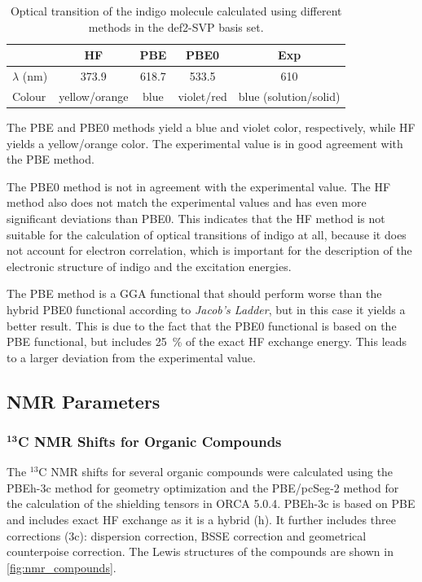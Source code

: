 \documentclass[fontsize=11pt,a4paper,oneside]{scrartcl}
\begin{document}
\begin{table}[htbp]
    \centering
    \caption{Optical transition of the indigo molecule calculated using different methods in the def2-SVP basis set.}
        \begin{tabular}{@{}lcccc@{}} \toprule
        & HF & PBE & PBE0 & Exp\autocite{AKGrimme2025} \\
        \midrule
        $\lambda$ (nm) & 373.9 & 618.7 & 533.5 & 610 \\
        Colour & yellow/orange & blue & violet/red & blue (solution/solid) \\
        \bottomrule
        \end{tabular}
        \label{tab:indigo_optical_transitions}
\end{table}

The \ac{PBE} and \ac{PBE0} methods yield a blue and violet color, respectively, while \ac{HF} yields a yellow/orange color. The experimental value is in good agreement with the \ac{PBE} method.

The \ac{PBE0} method is not in agreement with the experimental value. The \ac{HF} method also does not match the experimental values and has even more significant deviations than \ac{PBE0}. This indicates that the \ac{HF} method is not suitable for the calculation of optical transitions of indigo at all, because it does not account for electron correlation, which is important for the description of the electronic structure of indigo and the excitation energies. 

The \ac{PBE} method is a GGA functional that should perform worse than the hybrid \ac{PBE0} functional according to \textit{Jacob's Ladder}, but in this case it yields a better result. This is due to the fact that the \ac{PBE0} functional is based on the \ac{PBE} functional, but includes 25~\% of the exact \ac{HF} exchange energy. This leads to a larger deviation from the experimental value.

\clearpage
\subsection{NMR Parameters}

\subsubsection*{$^\mathbf{13}$C NMR Shifts for Organic Compounds}

The $^{13}$C NMR shifts for several organic compounds were calculated using the \ac{PBEh-3c}\autocite{Grimme2015} method for geometry optimization and the \ac{PBE}\autocite{Perdew1996}/pcSeg-2\autocite{Jensen2001} method for the calculation of the shielding tensors in ORCA 5.0.4\autocite{Neese2012,Neese2022}. \Ac{PBEh-3c} is based on \ac{PBE} and includes exact \ac{HF} exchange as it is a hybrid (h). It further includes three corrections (3c): dispersion correction, \ac{BSSE} correction and geometrical counterpoise correction. The Lewis structures of the compounds are shown in \autoref{fig:nmr_compounds}.
\end{document}
